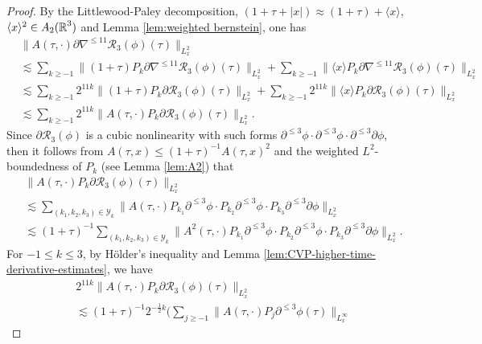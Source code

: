 \documentclass[11pt,twoside]{article}
\def\cY{\mathcal Y}
\def\R{\mathop{\mathbb R\kern 0pt}\nolimits}
\def\p{\partial}
\def\ls{\lesssim}
\newcommand{\w}[1]{\langle {#1} \rangle}
\theoremstyle{plain}
\theoremstyle{definition}
\theoremstyle{assumption}
\numberwithin{equation}{section}
\begin{document}
\begin{proof}
		By the Littlewood-Paley decomposition, $(1+\tau+|x|)\approx(1+\tau)+\w{x}$,
		$\w{x}^{2}\in A_2(\R^3)$ and Lemma \ref{lem:weighted bernstein}, one has
		\begin{equation}
			\label{eq:CVP-Apartial-R3-LP-start}
			\begin{aligned}
				&\|A(\tau,\cdot)\p\nabla^{\le 11}\mathcal R_3(\phi)(\tau)\|_{L^2_x}\\
				&\ls
				\sum_{k\ge -1}
				\|(1+\tau)P_k\p\nabla^{\le 11}\mathcal R_3(\phi)(\tau)\|_{L^2_x}
				+
				\sum_{k\ge -1}
				\|\w{x}P_k\p\nabla^{\le 11}\mathcal R_3(\phi)(\tau)\|_{L^2_x}\\
				&\ls
				\sum_{k\ge -1}
				2^{11k}\|(1+\tau)P_k\p\mathcal R_3(\phi)(\tau)\|_{L^2_x}
				+
				\sum_{k\ge -1}
				2^{11k}\|\w{x}P_k\p\mathcal R_3(\phi)(\tau)\|_{L^2_x}\\
				&\ls
				\sum_{k\ge -1}
				2^{11k}\|A(\tau,\cdot)P_k\p\mathcal R_3(\phi)(\tau)\|_{L^2_x}.
			\end{aligned}
		\end{equation}
		Since \(\p \mathcal R_3(\phi)\) is a cubic nonlinearity with such forms
		$\p^{\le3}\phi\cdot \p^{\le3}\phi\cdot \p^{\le3}\p\phi$,
		then it follows from
		$A(\tau,x)\le(1+\tau)^{-1}A(\tau,x)^2$
		and the weighted \(L^2\)-boundedness of \(P_k\) (see Lemma \ref{lem:A2}) that
		\begin{equation}
			\label{eq:CVP-R3-dyadic-product}
			\begin{aligned}
				&
				\|A(\tau,\cdot)P_k\p \mathcal R_3(\phi)(\tau)\|_{L^2_x}
				\\
				&\ls
				\sum_{(k_1,k_2,k_3)\in\cY_k}
				\|A(\tau,\cdot)P_{k_1}\p^{\le3}\phi
				\cdot
				P_{k_2}\p^{\le3}\phi
				\cdot
				P_{k_3}\p^{\le3}\p\phi\|_{L^2_x}
				\\
				&\ls
				(1+\tau)^{-1}
				\sum_{(k_1,k_2,k_3)\in\cY_k}
				\|A^2(\tau,\cdot)P_{k_1}\p^{\le3}\phi
				\cdot
				P_{k_2}\p^{\le3}\phi
				\cdot
				P_{k_3}\p^{\le3}\p\phi\|_{L^2_x}.
			\end{aligned}
		\end{equation}
		For \(-1\le k\le3\), by H\"older's inequality and Lemma \ref{lem:CVP-higher-time-derivative-estimates}, we have
		\begin{equation}
			\label{eq:CVP-R3-low-frequency}
			\begin{aligned}
				&
				2^{11k}
				\|A(\tau,\cdot)P_k\p \mathcal R_3(\phi)(\tau)\|_{L^2_x}
				\\
				&\ls
				(1+\tau)^{-1}2^{-\frac12 k}
				\big(
				\sum_{j\ge-1}
				\|A(\tau,\cdot)P_j\p^{\le3}\phi(\tau)\|_{L^\infty_x}

\end{aligned}
\end{equation}
\end{proof}
\end{document}
